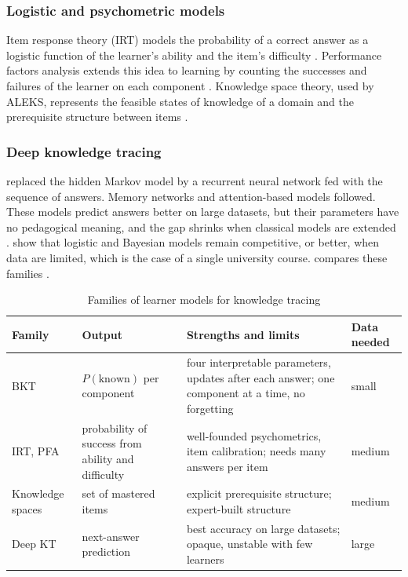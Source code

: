 \subsubsection{Logistic and psychometric models}
Item response theory (IRT)
models the probability of a correct answer as a logistic function of the
learner's ability and the item's difficulty \cite{lord1980}. Performance
factors analysis extends this idea to learning by counting the successes
and failures of the learner on each component \cite{pavlik2009}. Knowledge
space theory, used by ALEKS, represents the feasible states of knowledge of
a domain and the prerequisite structure between items \cite{doignon1999}.

\subsubsection{Deep knowledge tracing}
\citet{piech2015} replaced the hidden
Markov model by a recurrent neural network fed with the sequence of
answers. Memory networks \cite{zhang2017dkvmn} and attention-based models
\cite{pandey2019sakt,ghosh2020akt} followed. These models predict answers
better on large datasets, but their parameters have no pedagogical meaning,
and the gap shrinks when classical models are extended
\cite{khajah2016}. \citet{gervet2020} show that logistic and Bayesian
models remain competitive, or better, when data are limited, which is the
case of a single university course.  compares these
families \cite{pelanek2017,abdelrahman2023}.

\begin{table}[htbp]
\centering
\caption{Families of learner models for knowledge tracing}
\label{tab-kt-families}
\small
\begin{tabularx}{\textwidth}{@{}L{2.6cm}L{3.2cm}YL{2.1cm}@{}}
\toprule
\textbf{Family} & \textbf{Output} & \textbf{Strengths and limits} & \textbf{Data needed} \\
\midrule
BKT \cite{corbett1994kt} & $P(\text{known})$ per component & four interpretable parameters, updates after each answer; one component at a time, no forgetting & small \\
IRT, PFA \cite{lord1980,pavlik2009} & probability of success from ability and difficulty & well-founded psychometrics, item calibration; needs many answers per item & medium \\
Knowledge spaces \cite{doignon1999} & set of mastered items & explicit prerequisite structure; expert-built structure & medium \\
Deep KT \cite{piech2015,ghosh2020akt} & next-answer prediction & best accuracy on large datasets; opaque, unstable with few learners & large \\
\bottomrule
\end{tabularx}
\end{table}

